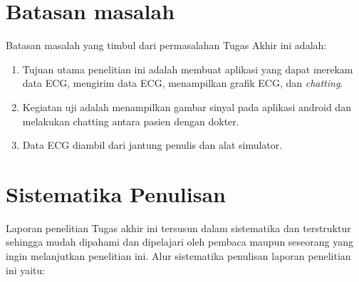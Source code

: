\section{Batasan masalah}
\vspace{1ex}
Batasan masalah yang timbul dari permasalahan Tugas Akhir ini adalah:
\vspace{1ex}
\begin{enumerate}[nolistsep]
	\item Tujuan utama penelitian ini adalah membuat aplikasi yang dapat merekam data ECG, mengirim data ECG, menampilkan grafik ECG, dan \textit{chatting}. 
	\vspace{1ex}
	
	\item Kegiatan uji adalah menampilkan gambar sinyal pada aplikasi android dan melakukan chatting antara pasien dengan dokter.
	\vspace{1ex}
	
	\item Data ECG diambil dari jantung penulis dan alat simulator.
		 
\end{enumerate}
\vspace{1ex}

\section{Sistematika Penulisan}
\vspace{1ex}
Laporan penelitian Tugas akhir ini tersusun dalam sistematika dan terstruktur sehingga mudah dipahami dan dipelajari oleh pembaca maupun seseorang yang ingin melanjutkan penelitian ini. Alur sistematika penulisan laporan penelitian ini yaitu:
\vspace{1ex}

